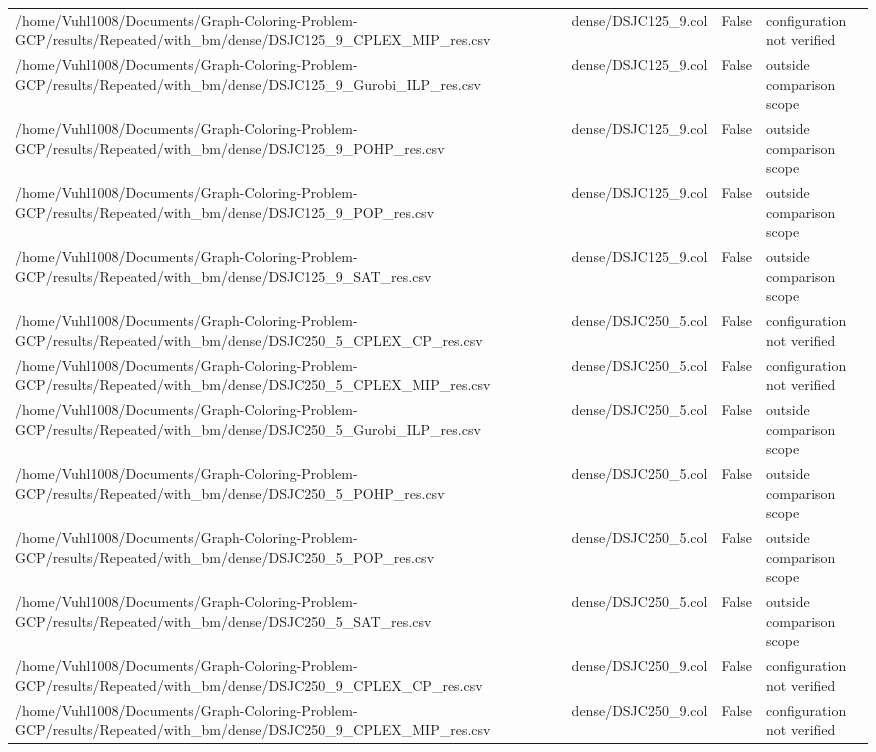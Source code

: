 \begin{table}[htbp]
\begin{tabular}{llll}
/home/Vuhl1008/Documents/Graph-Coloring-Problem-GCP/results/Repeated/with\_bm/dense/DSJC125\_9\_CPLEX\_MIP\_res.csv & dense/DSJC125\_9.col & False & configuration not verified \\
/home/Vuhl1008/Documents/Graph-Coloring-Problem-GCP/results/Repeated/with\_bm/dense/DSJC125\_9\_Gurobi\_ILP\_res.csv & dense/DSJC125\_9.col & False & outside comparison scope \\
/home/Vuhl1008/Documents/Graph-Coloring-Problem-GCP/results/Repeated/with\_bm/dense/DSJC125\_9\_POHP\_res.csv & dense/DSJC125\_9.col & False & outside comparison scope \\
/home/Vuhl1008/Documents/Graph-Coloring-Problem-GCP/results/Repeated/with\_bm/dense/DSJC125\_9\_POP\_res.csv & dense/DSJC125\_9.col & False & outside comparison scope \\
/home/Vuhl1008/Documents/Graph-Coloring-Problem-GCP/results/Repeated/with\_bm/dense/DSJC125\_9\_SAT\_res.csv & dense/DSJC125\_9.col & False & outside comparison scope \\
/home/Vuhl1008/Documents/Graph-Coloring-Problem-GCP/results/Repeated/with\_bm/dense/DSJC250\_5\_CPLEX\_CP\_res.csv & dense/DSJC250\_5.col & False & configuration not verified \\
/home/Vuhl1008/Documents/Graph-Coloring-Problem-GCP/results/Repeated/with\_bm/dense/DSJC250\_5\_CPLEX\_MIP\_res.csv & dense/DSJC250\_5.col & False & configuration not verified \\
/home/Vuhl1008/Documents/Graph-Coloring-Problem-GCP/results/Repeated/with\_bm/dense/DSJC250\_5\_Gurobi\_ILP\_res.csv & dense/DSJC250\_5.col & False & outside comparison scope \\
/home/Vuhl1008/Documents/Graph-Coloring-Problem-GCP/results/Repeated/with\_bm/dense/DSJC250\_5\_POHP\_res.csv & dense/DSJC250\_5.col & False & outside comparison scope \\
/home/Vuhl1008/Documents/Graph-Coloring-Problem-GCP/results/Repeated/with\_bm/dense/DSJC250\_5\_POP\_res.csv & dense/DSJC250\_5.col & False & outside comparison scope \\
/home/Vuhl1008/Documents/Graph-Coloring-Problem-GCP/results/Repeated/with\_bm/dense/DSJC250\_5\_SAT\_res.csv & dense/DSJC250\_5.col & False & outside comparison scope \\
/home/Vuhl1008/Documents/Graph-Coloring-Problem-GCP/results/Repeated/with\_bm/dense/DSJC250\_9\_CPLEX\_CP\_res.csv & dense/DSJC250\_9.col & False & configuration not verified \\
/home/Vuhl1008/Documents/Graph-Coloring-Problem-GCP/results/Repeated/with\_bm/dense/DSJC250\_9\_CPLEX\_MIP\_res.csv & dense/DSJC250\_9.col & False & configuration not verified \\

\end{tabular}
\end{table}
